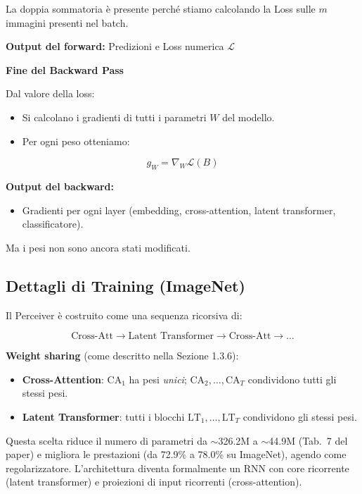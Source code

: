 \documentclass[
  11pt,
]{article}
\begin{document}
La doppia sommatoria è presente perché stiamo calcolando la Loss sulle
\(m\) immagini presenti nel batch.

\textbf{Output del forward:} Predizioni e Loss numerica \(\mathcal{L}\)

\textbf{Fine del Backward Pass}

Dal valore della loss:

\begin{itemize}
\item
  Si calcolano i gradienti di tutti i parametri \(W\) del modello.
\item
  Per ogni peso otteniamo:
\end{itemize}

\[g_{W} = \nabla_{W}\mathcal{L}(B)\]

\textbf{Output del backward:}

\begin{itemize}
\item
  Gradienti per ogni layer (embedding, cross-attention, latent
  transformer, classificatore).
\end{itemize}

Ma i pesi non sono ancora stati modificati.

\subsection{Dettagli di Training (ImageNet)}

Il Perceiver è costruito come una sequenza ricorsiva di:

\[\text{Cross-Att} \rightarrow \text{Latent Transformer} \rightarrow \text{Cross-Att} \rightarrow \ldots\]

\textbf{Weight sharing} (come descritto nella Sezione 1.3.6):
\begin{itemize}
\item \textbf{Cross-Attention}: $\text{CA}_1$ ha pesi \emph{unici}; $\text{CA}_2, \ldots, \text{CA}_T$ condividono tutti gli stessi pesi.
\item \textbf{Latent Transformer}: tutti i blocchi $\text{LT}_1, \ldots, \text{LT}_T$ condividono gli stessi pesi.
\end{itemize}

Questa scelta riduce il numero di parametri da $\sim$326.2M a $\sim$44.9M (Tab.\ 7 del paper) e migliora le prestazioni (da 72.9\% a 78.0\% su ImageNet), agendo come regolarizzatore. L'architettura diventa formalmente un RNN con core ricorrente (latent transformer) e proiezioni di input ricorrenti (cross-attention).
\end{document}
